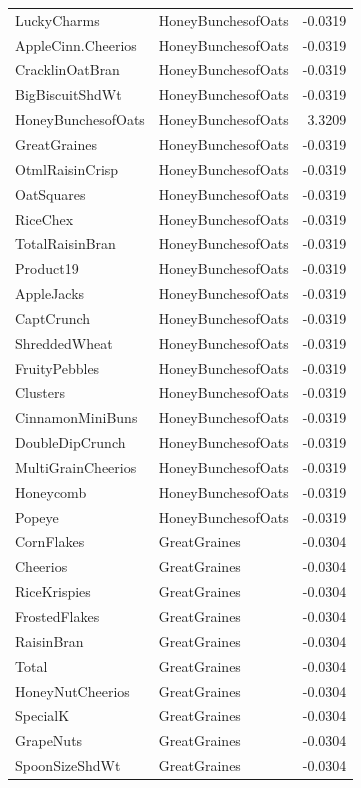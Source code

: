 \begin{longtable}{llr}
LuckyCharms & HoneyBunchesofOats & -0.0319 \\
AppleCinn.Cheerios & HoneyBunchesofOats & -0.0319 \\
CracklinOatBran & HoneyBunchesofOats & -0.0319 \\
BigBiscuitShdWt & HoneyBunchesofOats & -0.0319 \\
HoneyBunchesofOats & HoneyBunchesofOats & 3.3209 \\
GreatGraines & HoneyBunchesofOats & -0.0319 \\
OtmlRaisinCrisp & HoneyBunchesofOats & -0.0319 \\
OatSquares & HoneyBunchesofOats & -0.0319 \\
RiceChex & HoneyBunchesofOats & -0.0319 \\
TotalRaisinBran & HoneyBunchesofOats & -0.0319 \\
Product19 & HoneyBunchesofOats & -0.0319 \\
AppleJacks & HoneyBunchesofOats & -0.0319 \\
CaptCrunch & HoneyBunchesofOats & -0.0319 \\
ShreddedWheat & HoneyBunchesofOats & -0.0319 \\
FruityPebbles & HoneyBunchesofOats & -0.0319 \\
Clusters & HoneyBunchesofOats & -0.0319 \\
CinnamonMiniBuns & HoneyBunchesofOats & -0.0319 \\
DoubleDipCrunch & HoneyBunchesofOats & -0.0319 \\
MultiGrainCheerios & HoneyBunchesofOats & -0.0319 \\
Honeycomb & HoneyBunchesofOats & -0.0319 \\
Popeye & HoneyBunchesofOats & -0.0319 \\
CornFlakes & GreatGraines & -0.0304 \\
Cheerios & GreatGraines & -0.0304 \\
RiceKrispies & GreatGraines & -0.0304 \\
FrostedFlakes & GreatGraines & -0.0304 \\
RaisinBran & GreatGraines & -0.0304 \\
Total & GreatGraines & -0.0304 \\
HoneyNutCheerios & GreatGraines & -0.0304 \\
SpecialK & GreatGraines & -0.0304 \\
GrapeNuts & GreatGraines & -0.0304 \\
SpoonSizeShdWt & GreatGraines & -0.0304 \\

\end{longtable}

